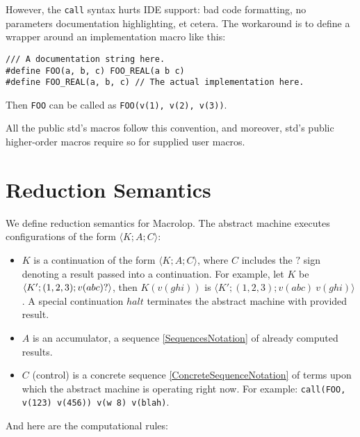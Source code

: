 \documentclass[12pt]{article}
\theoremstyle{break}
\begin{document}
However, the \texttt{call} syntax hurts IDE support: bad code formatting, no parameters
documentation highlighting, et cetera. The workaround is to define a wrapper around
an implementation macro like this:

\begin{verbatim}
/// A documentation string here.
#define FOO(a, b, c) FOO_REAL(a b c)
#define FOO_REAL(a, b, c) // The actual implementation here.
\end{verbatim}

Then \texttt{FOO} can be called as \texttt{FOO(v(1), v(2), v(3))}.

All the public std's macros follow this convention, and moreover, std's public
higher-order macros require so for supplied user macros.

\section{Reduction Semantics}

We define reduction semantics for Macrolop. The abstract machine executes configurations
of the form $\langle K; A; C \rangle$:

\begin{itemize}
    \item $K$ is a continuation of the form $\langle K; A; C \rangle$, where
    $C$ includes the $?$ sign denoting a result passed into a continuation.
    For example, let $K$ be $\langle K'; (1, 2, 3); v(abc) \\ ? \rangle$,
    then $K(v(ghi))$ is $\langle K'; (1, 2, 3); v(abc) \ v(ghi) \rangle$. A special
    continuation $halt$ terminates the abstract machine with provided result.

    \item $A$ is an accumulator, a sequence \ref{SequencesNotation} of already computed
    results.

    \item $C$ (control) is a concrete sequence \ref{ConcreteSequenceNotation} of terms
    upon which the abstract machine is operating right now. For example:
    \texttt{call(FOO, v(123) v(456)) v(w 8) v(blah)}.
\end{itemize}

And here are the computational rules:
\end{document}
